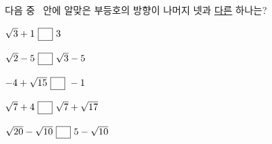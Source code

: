 다음 중 \blank\ 안에 알맞은 부등호의 방향이 나머지 넷과 \underline{다른} 하나는?
\begin{choicesii}{\rule[-3ex]{0pt}{8ex}$\sqrt{3}+1\ \blank\ 3$}{\rule[-3ex]{0pt}{8ex}$\sqrt{2}-5\ \blank\ \sqrt{3}-5$}{\rule[-3ex]{0pt}{8ex}$-4+\sqrt{15}\ \blank\ -1$}{\rule[-3ex]{0pt}{8ex}$\sqrt{7}+4\ \blank\ \sqrt{7}+\sqrt{17}$}{\rule[-3ex]{0pt}{8ex}$\sqrt{20}-\sqrt{10}\ \blank\ 5-\sqrt{10}$}\end{choicesii}
